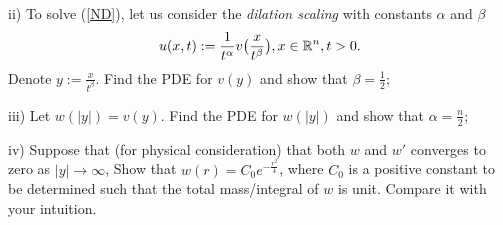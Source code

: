 \documentclass[6pt]{article}
\numberwithin{equation}{section}
\def\mathbb{\Bbb}
\begin{document}
\begin{enumerate}
ii) To solve (\ref{ND}), let us consider the \emph{dilation scaling} with constants $\alpha$ and $\beta$
\[u(x,t):=\frac{1}{t^\alpha}v\big(\frac{x}{t^\beta}\big),x\in\mathbb R^n,t>0.\]
Denote $y:=\frac{x}{t^\beta}$.  Find the PDE for $v(y)$ and show that $\beta=\frac{1}{2}$;

iii) Let $w(|y|)=v(y)$.  Find the PDE for $w(|y|)$ and show that $\alpha=\frac{n}{2}$;

iv) Suppose that (for physical consideration) that both $w$ and $w'$ converges to zero as $|y|\rightarrow\infty$,  Show that $w(r)=C_0e^{-\frac{r^2}{4}}$, where $C_0$ is a positive constant to be determined such that the total mass/integral of $w$ is unit.  Compare it with your intuition.

\end{enumerate}
\end{document}
